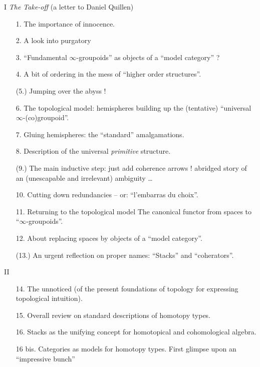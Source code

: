 \documentclass[11pt,a4paper]{article}
\begin{document}
I \emph{The Take-off} (a letter to Daniel Quillen)
\begin{itemize}
  \item[1.] The importance of innocence.
  \item[2.] A   look into purgatory
  \item[3.] ``Fundamental $\infty$-groupoids'' as objects of a ``model category'' ?
  \item[4.] A bit of ordering in the mess of ``higher order structures''.
  \item[(5.)] Jumping over the abyss !
  \item[6.] The topological model: hemispheres building up the (tentative) ``universal $\infty$-(co)groupoid''.
  \item[7.] Gluing hemispheres: the ``standard'' amalgamations.
  \item[8.] Description of the universal \emph{primitive} structure.
  \item[(9.)] The main inductive step: just add coherence arrows !   abridged story  of an (unescapable and irrelevant) ambiguity …
  \item[10.] Cutting down redundancies -- or: ``l'embarras du choix''.
  \item[11.] Returning to the topological model  The  canonical functor from spaces to ``$\infty$-groupoids''.
  \item[12.] About replacing spaces by objects of a ``model category''.
  \item[(13.)]  An urgent reflection on proper names: ``Stacks'' and ``coherators''.
\end{itemize}

\struck{\ill{}} II 
\begin{itemize}
  \item[14.]  The  unnoticed   (of the present foundations of topology for expressing topological intuition).
  \item[15.] Overall review on \add{(}standard\add{)} descriptions of homotopy types. 
  \item[16.]  Stacks  as the unifying concept for homotopical and cohomological algebra.
  \item[16 bis.] Categories as models for homotopy types. First glimpse upon an ``impressive bunch'' 
\end{itemize}
\end{document}
